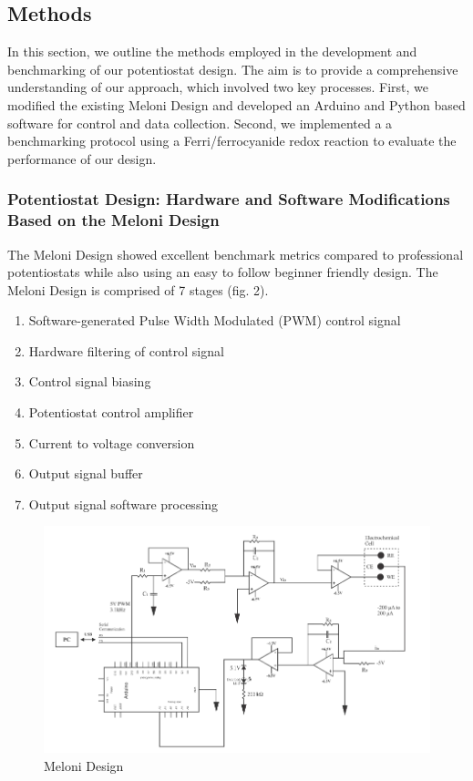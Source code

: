 \documentclass{article}
\begin{document}
\subsection*{Methods}

In this section, we outline the methods employed in the development and benchmarking of our potentiostat design. The aim is to provide a comprehensive understanding of our approach, which involved two key processes. First, we modified the existing Meloni Design and developed an Arduino and Python based software for control and data collection. Second, we implemented a a benchmarking protocol using a Ferri/ferrocyanide redox reaction to evaluate the performance of our design. 

\subsubsection*{Potentiostat Design: Hardware and Software Modifications Based on the Meloni Design}

The Meloni Design showed excellent benchmark metrics compared to professional potentiostats while also using an easy to follow beginner friendly design. The Meloni Design is comprised of 7 stages (fig. 2).
\begin{enumerate}
    \item Software-generated Pulse Width Modulated (PWM) control signal
    \item Hardware filtering of control signal
    \item Control signal biasing
    \item Potentiostat control amplifier
    \item Current to voltage conversion
    \item Output signal buffer
    \item Output signal software processing
\end{enumerate}

\begin{figure}[H]
    \centering
    \includegraphics[width=.9\linewidth]{meloni_design.png}
    \caption{Meloni Design}
\end{figure}
\end{document}
